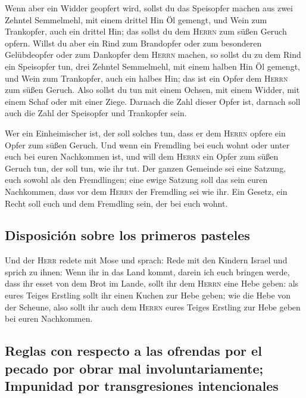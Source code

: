  Wenn aber ein Widder geopfert wird, sollst du das
Speisopfer machen aus zwei Zehntel Semmelmehl, mit einem drittel Hin Öl
gemengt,  und Wein zum Trankopfer, auch ein drittel Hin;
das sollst du dem \textsc{Herrn} zum süßen Geruch opfern. 
Willst du aber ein Rind zum Brandopfer oder zum besonderen Gelübdeopfer
oder zum Dankopfer dem \textsc{Herrn} machen,  so sollst
du zu dem Rind ein Speisopfer tun, drei Zehntel Semmelmehl, mit einem
halben Hin Öl gemengt,  und Wein zum Trankopfer, auch ein
halbes Hin; das ist ein Opfer dem \textsc{Herrn} zum süßen Geruch.
 Also sollst du tun mit einem Ochsen, mit einem Widder,
mit einem Schaf oder mit einer Ziege.  Darnach die Zahl
dieser Opfer ist, darnach soll auch die Zahl der Speisopfer und
Trankopfer sein.

 Wer ein Einheimischer ist, der soll solches tun, dass er
dem \textsc{Herrn} opfere ein Opfer zum süßen Geruch. 
Und wenn ein Fremdling bei euch wohnt oder unter euch bei euren
Nachkommen ist, und will dem \textsc{Herrn} ein Opfer zum süßen Geruch
tun, der soll tun, wie ihr tut.  Der ganzen Gemeinde sei
eine Satzung, euch sowohl als den Fremdlingen; eine ewige Satzung soll
das sein euren Nachkommen, dass vor dem \textsc{Herrn} der Fremdling sei
wie ihr.  Ein Gesetz, ein Recht soll euch und dem
Fremdling sein, der bei euch wohnt.

\hypertarget{disposiciuxf3n-sobre-los-primeros-pasteles}{%
\subsection{Disposición sobre los primeros
pasteles}\label{disposiciuxf3n-sobre-los-primeros-pasteles}}

 Und der \textsc{Herr} redete mit Mose und sprach:
 Rede mit den Kindern Israel und sprich zu ihnen: Wenn
ihr in das Land kommt, darein ich euch bringen werde, 
dass ihr esset von dem Brot im Lande, sollt ihr dem \textsc{Herrn} eine
Hebe geben:  als eures Teiges Erstling sollt ihr einen
Kuchen zur Hebe geben; wie die Hebe von der Scheune, 
also sollt ihr auch dem \textsc{Herrn} eures Teiges Erstling zur Hebe
geben bei euren Nachkommen.

\hypertarget{reglas-con-respecto-a-las-ofrendas-por-el-pecado-por-obrar-mal-involuntariamente-impunidad-por-transgresiones-intencionales}{%
\subsection{Reglas con respecto a las ofrendas por el pecado por obrar
mal involuntariamente; Impunidad por transgresiones
intencionales}\label{reglas-con-respecto-a-las-ofrendas-por-el-pecado-por-obrar-mal-involuntariamente-impunidad-por-transgresiones-intencionales}}

